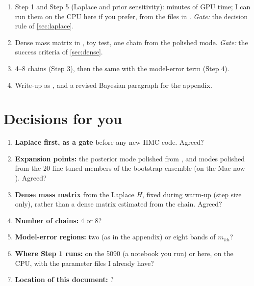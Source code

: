 \begin{enumerate}
  \item Step 1 and Step 5 (Laplace and prior sensitivity): minutes of GPU time; I can run
    them on the CPU here if you prefer, from the files in . \emph{Gate:} the
    decision rule of \cref{sec:laplace}.
  \item Dense mass matrix in , toy test, one chain from the polished mode.
    \emph{Gate:} the success criteria of \cref{sec:dense}.
  \item 4--8 chains (Step 3), then the same with the model-error term (Step 4).
  \item Write-up as , and a revised Bayesian paragraph for the
    appendix.
\end{enumerate}

\section{Decisions for you}
\label{sec:decisions}

\begin{keyidea}
\begin{enumerate}
  \item \textbf{Laplace first, as a gate} before any new HMC code. Agreed?
  \item \textbf{Expansion points:} the posterior mode polished from ,
    and modes polished from the 20 fine-tuned members of the bootstrap
    ensemble (on the Mac now ). Agreed?
  \item \textbf{Dense mass matrix} from the Laplace $H$, fixed during warm-up (step size
    only), rather than a dense matrix estimated from the chain. Agreed?
  \item \textbf{Number of chains:} 4 or 8?
  \item \textbf{Model-error regions:} two (as in the appendix) or eight bands of $m_{hh}$?
  \item \textbf{Where Step 1 runs:} on the 5090 (a notebook you run) or here, on the CPU,
    with the parameter files I already have?
  \item \textbf{Location of this document:} ?
\end{enumerate}
\end{keyidea}

